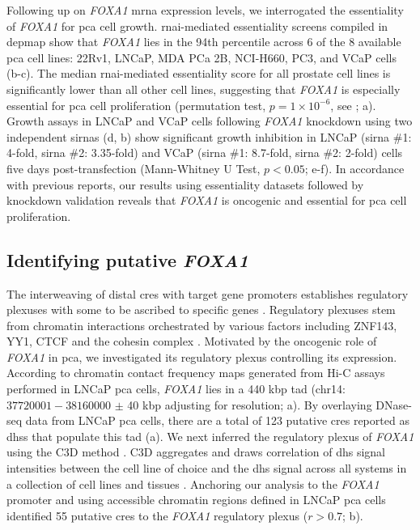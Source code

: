 Following up on \emph{FOXA1} \gls{mrna} expression levels, we interrogated the essentiality of \emph{FOXA1} for \gls{pca} cell growth.
\gls{rnai}-mediated essentiality screens compiled in \gls{depmap} show that \emph{FOXA1} lies in the 94th percentile across 6 of the 8 available \gls{pca} cell lines: 22Rv1, LNCaP, MDA PCa 2B, NCI-H660, PC3, and VCaP cells (b-c).
The median \gls{rnai}-mediated essentiality score for all prostate cell lines is significantly lower than all other cell lines, suggesting that \emph{FOXA1} is especially essential for \gls{pca} cell proliferation (permutation test, $p = 1 \times 10^{-6}$, see ; a).
Growth assays in LNCaP and VCaP cells following \emph{FOXA1} knockdown using two independent \gls{sirna}s (d, b) show significant growth inhibition in LNCaP (\gls{sirna} \#1: 4-fold, \gls{sirna} \#2: 3.35-fold) and VCaP (\gls{sirna} \#1: 8.7-fold, \gls{sirna} \#2: 2-fold) cells five days post-transfection (Mann-Whitney U Test, $p<0.05$; e-f).
In accordance with previous reports, our results using essentiality datasets followed by knockdown validation reveals that \emph{FOXA1} is oncogenic and essential for \gls{pca} cell proliferation.

\subsection{Identifying putative \emph{FOXA1} }

The interweaving of distal \glspl{cre} with target gene promoters establishes regulatory plexuses with some to be ascribed to specific genes \cite{sallariConvergenceDispersedRegulatory2016,baileyNoncodingSomaticInherited2016}.
Regulatory plexuses stem from chromatin interactions orchestrated by various factors including ZNF143, YY1, CTCF and the cohesin complex \cite{phillipsCTCFMasterWeaver2009,weintraubYY1StructuralRegulator2017,baileyZNF143ProvidesSequence2015}.
Motivated by the oncogenic role of \emph{FOXA1} in \gls{pca}, we investigated its regulatory plexus controlling its expression.
According to chromatin contact frequency maps generated from Hi-C assays performed in LNCaP \gls{pca} cells, \emph{FOXA1} lies in a 440 kbp \gls{tad} (chr14: $37720001-38160000$ $\pm$ 40 kbp adjusting for resolution; a).
By overlaying DNase-seq data from LNCaP \gls{pca} cells, there are a total of 123 putative \glspl{cre} reported as \glspl{dhs} that populate this \gls{tad} (a).
We next inferred the regulatory plexus of \emph{FOXA1} using the C3D method \cite{mehdiC3DToolPredict2019}.
C3D aggregates and draws correlation of \gls{dhs} signal intensities between the cell line of choice and the \gls{dhs} signal across all systems in a collection of cell lines and tissues \cite{mehdiC3DToolPredict2019}.
Anchoring our analysis to the \emph{FOXA1} promoter and using accessible chromatin regions defined in LNCaP \gls{pca} cells identified 55 putative \glspl{cre} to the \emph{FOXA1} regulatory plexus ($r > 0.7$; b).

